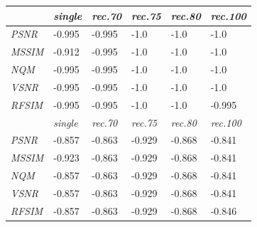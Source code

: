 \documentclass[10pt,twocolumn,letterpaper]{article}
\begin{document}
\begin{table}\footnotesize\centering
\begin{tabular}{ | l || l | l | l | l | l | }
    \hline
    & \emph{single} & \emph{rec.70} & \emph{rec.75} & \emph{rec.80} & \emph{rec.100} \\ \hline
    \emph{PSNR} & -0.995 \cellcolor[rgb]{0,0.65,0} & -0.995 \cellcolor[rgb]{0,0.65,0} & -1.0 \cellcolor[rgb]{0,0.65,0} & -1.0 \cellcolor[rgb]{0,0.65,0} & -1.0 \cellcolor[rgb]{0,0.65,0} \\ \hline
    \emph{MSSIM} & -0.912 \cellcolor[rgb]{0,0.65,0} & -0.995 \cellcolor[rgb]{0,0.65,0} & -1.0 \cellcolor[rgb]{0,0.65,0} & -1.0 \cellcolor[rgb]{0,0.65,0} & -1.0 \cellcolor[rgb]{0,0.65,0} \\ \hline
    \emph{NQM} & -0.995 \cellcolor[rgb]{0,0.65,0} & -0.995 \cellcolor[rgb]{0,0.65,0} & -1.0 \cellcolor[rgb]{0,0.65,0} & -1.0 \cellcolor[rgb]{0,0.65,0} & -1.0 \cellcolor[rgb]{0,0.65,0} \\ \hline
    \emph{VSNR} & -0.995 \cellcolor[rgb]{0,0.65,0} & -0.995 \cellcolor[rgb]{0,0.65,0} & -1.0 \cellcolor[rgb]{0,0.65,0} & -1.0 \cellcolor[rgb]{0,0.65,0} & -1.0 \cellcolor[rgb]{0,0.65,0} \\ \hline
    \emph{RFSIM} & -0.995 \cellcolor[rgb]{0,0.65,0} & -0.995 \cellcolor[rgb]{0,0.65,0} & -1.0 \cellcolor[rgb]{0,0.65,0} & -1.0 \cellcolor[rgb]{0,0.65,0} & -0.995 \cellcolor[rgb]{0,0.65,0} \\ \hline
    \hline
    
    \hline
    & \emph{single} & \emph{rec.70} & \emph{rec.75} & \emph{rec.80} & \emph{rec.100} \\ \hline
    \emph{PSNR} & -0.857 \cellcolor[rgb]{0,0.65,0} & -0.863 \cellcolor[rgb]{0,0.65,0} & -0.929 \cellcolor[rgb]{0,0.65,0} & -0.868 \cellcolor[rgb]{0,0.65,0} & -0.841 \cellcolor[rgb]{0,0.65,0} \\ \hline
    \emph{MSSIM} & -0.923 \cellcolor[rgb]{0,0.65,0} & -0.863 \cellcolor[rgb]{0,0.65,0} & -0.929 \cellcolor[rgb]{0,0.65,0} & -0.868 \cellcolor[rgb]{0,0.65,0} & -0.841 \cellcolor[rgb]{0,0.65,0} \\ \hline
    \emph{NQM} & -0.857 \cellcolor[rgb]{0,0.65,0} & -0.863 \cellcolor[rgb]{0,0.65,0} & -0.929 \cellcolor[rgb]{0,0.65,0} & -0.868 \cellcolor[rgb]{0,0.65,0} & -0.841 \cellcolor[rgb]{0,0.65,0} \\ \hline
    \emph{VSNR} & -0.857 \cellcolor[rgb]{0,0.65,0} & -0.863 \cellcolor[rgb]{0,0.65,0} & -0.929 \cellcolor[rgb]{0,0.65,0} & -0.868 \cellcolor[rgb]{0,0.65,0} & -0.841 \cellcolor[rgb]{0,0.65,0} \\ \hline
    \emph{RFSIM} & -0.857 \cellcolor[rgb]{0,0.65,0} & -0.863 \cellcolor[rgb]{0,0.65,0} & -0.929 \cellcolor[rgb]{0,0.65,0} & -0.868 \cellcolor[rgb]{0,0.65,0} & -0.846 \cellcolor[rgb]{0,0.65,0} \\ \hline


\end{tabular}
\end{table}
\end{document}
